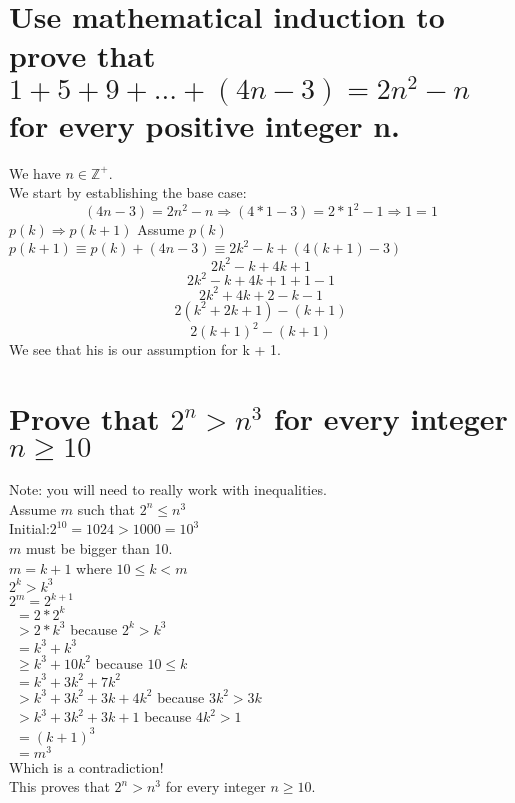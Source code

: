 \section{Use mathematical induction to prove that $1+5+9+...+(4n-3)=2n^2-n$ for every positive integer n.}
We have $n\in \mathbb{Z}^{+}$.\\
We start by establishing the base case:
\begin{equation}
(4n-3) = 2n^2-n \Rightarrow (4*1-3) = 2*1^2-1 \Rightarrow 1 = 1
\end{equation}
$p(k)\Rightarrow p(k+1)$
Assume $p(k)$\\
$p(k+1) \equiv p(k)+(4n-3) \equiv 2k^2-k+(4(k+1)-3)$\\
\begin{equation}
2k^2-k+4k+1
\end{equation}
\begin{equation}
2k^2-k+4k+1+1-1
\end{equation}
\begin{equation}
2k^2+4k+2-k-1
\end{equation}
\begin{equation}
2(k^2+2k+1)-(k+1)
\end{equation}
\begin{equation}
2(k+1)^2-(k+1)
\end{equation}
We see that his is our assumption for k + 1.{\Huge\Bat}


\section{Prove that $2^n>n^3$ for every integer $n\geq 10$}
Note: you will need to really work with inequalities.\\
Assume $m$ such that $2^n\leq n^3$\\
Initial:$2^{10}=1024 > 1000 = 10^3$\\
$m$ must be bigger than 10.\\
$m = k + 1$ where $10\leq k < m$\\
$2^k > k^3$\\
$2^m = 2^{k+1}$\\
$\ \ = 2*2^k$\\
$\ \ > 2*k^3$ because $2^k > k^3$\\
$\ \ = k^3+k^3$\\
$\ \ \geq k^3+10k^2$ because $10\leq k$\\
$\ \ =k^3+3k^2+7k^2$\\
$\ \ >k^3+3k^2+3k+4k^2$ because $3k^2 > 3k$\\
$\ \ >k^3+3k^2+3k+1$ because $4k^2 > 1$\\
$\ \ =(k+1)^3$\\
$\ \ =m^3$\\
Which is a contradiction!\\
This proves that $2^n > n^3$ for every integer $n\geq 10$.{\Huge\Bat}
